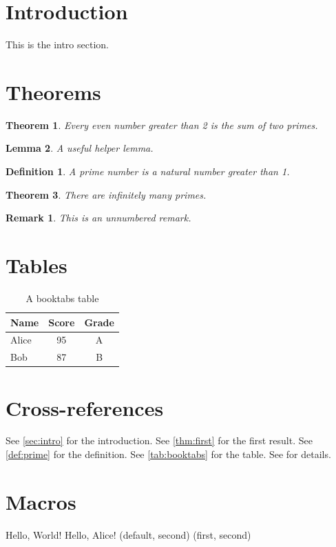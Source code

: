 \documentclass{article}
\newtheorem{theorem}{Theorem}
\newtheorem{definition}{Definition}
\newtheorem{lemma}[theorem]{Lemma}
\newtheorem*{remark}{Remark}
\newcommand{\greeting}[1][World]{Hello, #1!}
\newcommand{\pair}[2][default]{(#1, #2)}
\begin{document}
\section{Introduction}
\label{sec:intro}
This is the intro section.

\section{Theorems}
\label{sec:thms}

\begin{theorem}
\label{thm:first}
Every even number greater than 2 is the sum of two primes.
\end{theorem}

\begin{lemma}
\label{lem:helper}
A useful helper lemma.
\end{lemma}

\begin{definition}
\label{def:prime}
A prime number is a natural number greater than 1.
\end{definition}

\begin{theorem}
\label{thm:second}
There are infinitely many primes.
\end{theorem}

\begin{remark}
This is an unnumbered remark.
\end{remark}

\section{Tables}
\label{sec:tables}

\begin{table}[h]
\caption{A booktabs table}
\label{tab:booktabs}
\begin{tabular}{lcc}
\toprule
Name & Score & Grade \\
\midrule
Alice & 95 & A \\
Bob & 87 & B \\
\bottomrule
\end{tabular}
\end{table}

\section{Cross-references}
See \autoref{sec:intro} for the introduction.
See \autoref{thm:first} for the first result.
See \autoref{def:prime} for the definition.
See \autoref{tab:booktabs} for the table.
See  for details.

\section{Macros}
\greeting
\greeting[Alice]
\pair{second}
\pair[first]{second}
\end{document}

